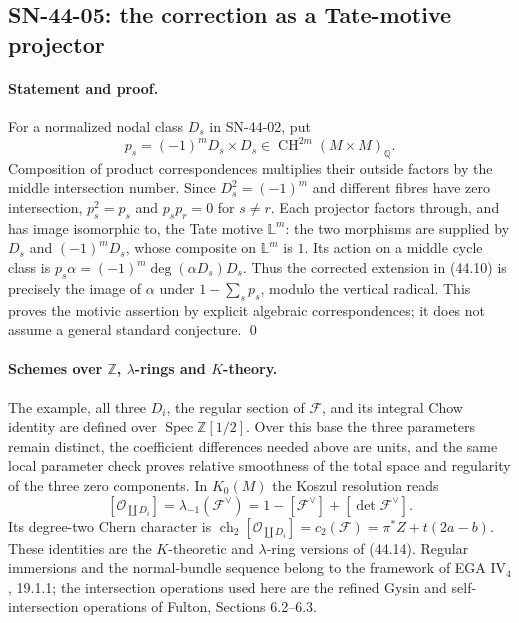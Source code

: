 \subsection{SN-44-05: the correction as a Tate-motive projector}
\label{sn:44-05}

\paragraph{Statement and proof.}
For a normalized nodal class $D_s$ in SN-44-02, put
\[
 p_s=(-1)^mD_s\times D_s\in\operatorname{CH}^{2m}(M\times M)_{\mathbb Q}.
\]
Composition of product correspondences multiplies their outside
factors by the middle intersection number.  Since
$D_s^2=(-1)^m$ and different fibres have zero intersection,
$p_s^2=p_s$ and $p_sp_r=0$ for $s\ne r$.
Each projector factors through, and has image isomorphic to,
the Tate motive $\mathbb L^m$: the two morphisms are supplied by
$D_s$ and $(-1)^mD_s$, whose composite on $\mathbb L^m$ is $1$.
Its action on a middle cycle class is
$p_s\alpha=(-1)^m\deg(\alpha D_s)D_s$.  Thus the corrected
extension in (44.10) is precisely the image of $\alpha$ under
$1-\sum_sp_s$, modulo the vertical radical.  This proves the
motivic assertion by explicit algebraic correspondences; it does
not assume a general standard conjecture. \qed

\paragraph{Schemes over $\mathbb Z$, $\lambda$-rings and $K$-theory.}
The example, all three $D_i$, the regular section of $\mathcal F$,
and its integral Chow identity are defined over
$\operatorname{Spec}\mathbb Z[1/2]$.  Over this base the three
parameters remain distinct, the coefficient differences needed
above are units, and the same local parameter check proves
relative smoothness of the total space and regularity of the
three zero components.  In $K_0(M)$ the Koszul resolution reads
\[
 [\mathcal O_{\coprod D_i}]
     =\lambda_{-1}(\mathcal F^\vee)
     =1-[\mathcal F^\vee]+[\det\mathcal F^\vee].
\]
Its degree-two Chern character is
$\operatorname{ch}_2[\mathcal O_{\coprod D_i}]
 =c_2(\mathcal F)=\pi^*Z+t(2a-b)$.
These identities are the $K$-theoretic and $\lambda$-ring versions
of (44.14).  Regular immersions and the normal-bundle sequence
belong to the framework of EGA IV$_4$, 19.1.1;
the intersection operations used here are the refined Gysin and
self-intersection operations of Fulton, Sections 6.2--6.3.

